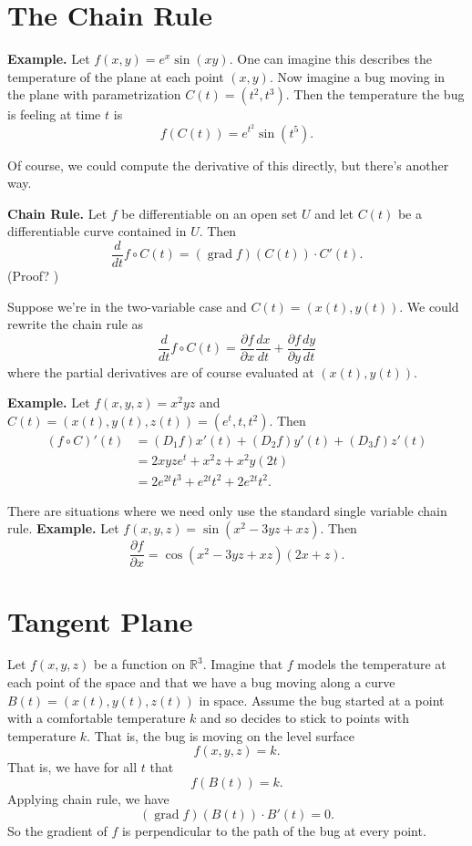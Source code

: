 \documentclass{article}
\DeclareMathOperator{\grd}{grad}
\begin{document}
\section*{The Chain Rule}

\textbf{Example.} Let $f(x,y) = e^x \sin(xy)$. One can imagine
this describes the temperature of the plane at each point $(x,y)$.
Now imagine a bug moving in the plane with parametrization
$C(t) = (t^2, t^3)$. Then the temperature the bug is feeling at time $t$
is 
\[f(C(t))=e^{t^2}\sin(t^5).\]

Of course, we could compute the derivative of this directly,
but there's another way.

\textbf{Chain Rule.} Let $f$ be differentiable on an open set $U$
and let $C(t)$ be a differentiable curve contained in $U$. Then 
\[\frac{d}{dt} f\circ C(t) = (\grd f)(C(t)) \cdot C'(t).\] (Proof?
)

Suppose we're in the two-variable case and 
$C(t) = (x(t),y(t))$. We could rewrite the chain rule as
\[\frac{d}{dt} f\circ C(t) = \frac{\partial f}{\partial x} \frac{dx}{dt} + \frac{\partial f}{\partial y} \frac{dy}{dt}\]
where the partial derivatives are of course evaluated at $(x(t),y(t))$.


\textbf{Example.} Let $f(x,y,z) = x^2 y z$ and 
$C(t) = (x(t),y(t),z(t)) = (e^t, t, t^2)$.
Then 
\begin{align*}
(f\circ C)'(t) &= (D_1 f) x'(t) + (D_2 f) y'(t) + (D_3 f) z'(t)\\
&= 2xyz e^t + x^2 z  + x^2 y (2t)\\
&= 2e^{2t} t^3 + e^{2t} t^2 + 2e^{2t} t^2.
\end{align*}

There are situations where we need only use the standard single variable chain rule.
\textbf{Example.}
Let $f(x,y,z)=\sin(x^2-3yz+xz)$.
Then 
\[\frac{\partial f}{\partial x} = \cos(x^2-3yz+xz)(2x + z).\]

\section*{Tangent Plane}
Let $f(x,y,z)$ be a function on $\mathbb{R}^3$. Imagine that $f$ models the 
temperature at each point of the space and that we have
a bug moving along a curve $B(t) = (x(t),y(t),z(t))$ in space. 
Assume the bug started at a point with a comfortable temperature $k$
and so decides to stick to points with temperature $k$. That is,
the bug is moving on the level surface
\[f(x,y,z)=k.\]
That is, we have for all $t$ that
\[f(B(t))=k.\]
Applying chain rule, we have
\[(\grd f)(B(t))\cdot B'(t) = 0.\]
So the gradient of $f$ is perpendicular to the path of the bug
at every point.
\end{document}
